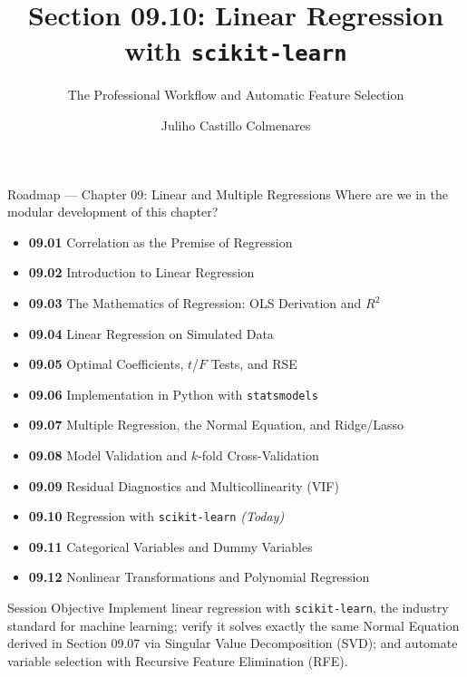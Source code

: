 \documentclass[10pt, aspectratio=169]{beamer}
\title[Regression with scikit-learn]{Section 09.10: Linear Regression with \texttt{scikit-learn}}
\subtitle{The Professional Workflow and Automatic Feature Selection}
\author[J. Castillo Colmenares]{Juliho Castillo Colmenares}
\institute{Tecnológico de Monterrey}
\date{\vspace{-1.5cm}}
\begin{document}
\begin{frame}[plain]
  \titlepage
\end{frame}

\begin{frame}{Roadmap --- Chapter 09: Linear and Multiple Regressions}
  \scriptsize
  Where are we in the modular development of this chapter?
  \begin{itemize}\itemsep=0.02em
    \item \textbf{09.01} Correlation as the Premise of Regression
    \item \textbf{09.02} Introduction to Linear Regression
    \item \textbf{09.03} The Mathematics of Regression: OLS Derivation and $R^2$
    \item \textbf{09.04} Linear Regression on Simulated Data
    \item \textbf{09.05} Optimal Coefficients, $t$/$F$ Tests, and RSE
    \item \textbf{09.06} Implementation in Python with \texttt{statsmodels}
    \item \textbf{09.07} Multiple Regression, the Normal Equation, and Ridge/Lasso
    \item \textbf{09.08} Model Validation and $k$-fold Cross-Validation
    \item \textbf{09.09} Residual Diagnostics and Multicollinearity (VIF)
    \item \textbf{09.10} Regression with \texttt{scikit-learn} \emph{(Today)}
    \item \textbf{09.11} Categorical Variables and Dummy Variables
    \item \textbf{09.12} Nonlinear Transformations and Polynomial Regression
  \end{itemize}
  \pause
  \vspace{-0.05cm}
  \begin{block}{Session Objective}
    Implement linear regression with \texttt{scikit-learn}, the industry standard for machine learning; verify it solves exactly the same Normal Equation derived in Section 09.07 via Singular Value Decomposition (SVD); and automate variable selection with Recursive Feature Elimination (RFE).
  \end{block}
\end{frame}
\end{document}
